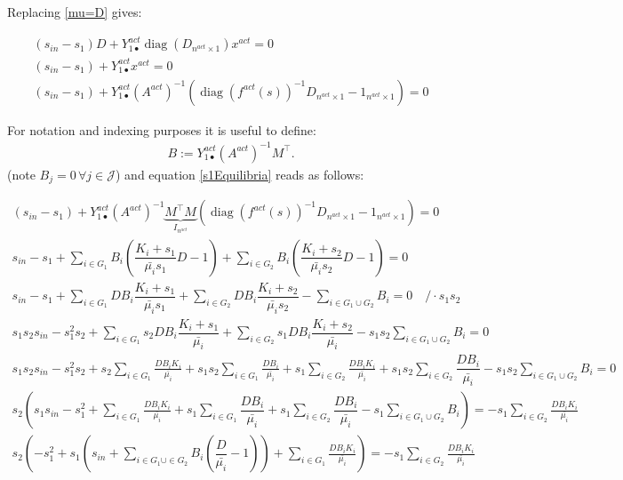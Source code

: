 \documentclass[processes,article,submit,moreauthors,pdftex]{Definitions/mdpi}
\DeclareMathOperator{\diag}{diag}
\begin{document}
Replacing \eqref{mu=D} gives: 

\begin{align} 
(s_{in}-s_1)D + Y^{act}_{1\bullet} \diag(D_{n^{act}\times 1})x^{act}  = 0  \\
(s_{in}-s_1) + Y^{act}_{1\bullet} x^{act}  = 0  \\
\label{s1Equilibria} (s_{in}-s_1) + Y^{act}_{1\bullet}(A^{act})^{-1}(\diag(f^{act}(s))^{-1}D_{n^{act}\times 1} - 1_{n^{act}\times 1}) = 0
\end{align} 

For notation and indexing purposes it is useful to define: 
\begin{align}
B := Y^{act}_{1\bullet} (A^{act})^{-1}M^\top.
\end{align}
(note $B_j = 0 \, \forall j \in \mathcal{J}$) and equation \eqref{s1Equilibria} reads as follows:

\begin{align}
(s_{in}-s_1) + Y^{act}_{1\bullet}(A^{act})^{-1}\underbrace{M^\top M}_{I_{n^{act}}}(\diag(f^{act}(s))^{-1} D_{n^{act}\times 1} - 1_{n^{act}\times 1}) = 0\\
\displaystyle s_{in} - s_1 + \sum \limits_{i \in G_1} B_i \left(\dfrac{K_i+s_1}{\bar{\mu_i}s_1}D - 1 \right) + \sum \limits_{i \in G_2 } B_i \left(\dfrac{K_i+s_2}{\bar{\mu_i}s_2}D - 1 \right)= 0 \label{to_be_reused}\\
\displaystyle s_{in} - s_1 + \sum \limits_{i \in G_1 } DB_i \dfrac{K_i+s_1}{\bar{\mu_i}s_1}+ \sum \limits_{i \in G_2 } DB_i \dfrac{K_i+s_2}{\bar{\mu_i}s_2} - \sum \limits_{i \in G_1 \cup G_2}B_i= 0 \quad /\cdot s_1s_2 
\\
\displaystyle s_1s_2 s_{in}- s^2_1s_2 + \sum \limits_{i \in G_1} s_2DB_i \dfrac{K_i+s_1}{\bar{\mu_i}}+ \sum \limits_{i \in G_2 } s_1DB_i \dfrac{K_i+s_2}{\bar{\mu_i}} - s_1s_2\sum \limits_{i \in G_1 \cup G_2}B_i= 0 \\
\displaystyle s_1s_2 s_{in}- s^2_1s_2 + s_2\sum \limits_{i \in G_1 } \frac{DB_iK_i}{\bar{\mu_i}}+s_1s_2\sum \limits_{i \in G_1 } \frac{DB_i}{\bar{\mu_i}}+ s_1\sum \limits_{i \in G_2 } \frac{DB_iK_i}{\bar{\mu_i}} + s_1s_2\sum \limits_{i \in G_2 } \dfrac{DB_i}{\bar{\mu_i}} - s_1s_2\sum \limits_{i \in G_1 \cup G_2}B_i= 0 \\
\displaystyle s_2\left(s_1s_{in} - s^2_1 + \sum \limits_{i \in G_1} \frac{DB_iK_i}{\bar{\mu_i}} +s_1\sum \limits_{i \in G_1 } \dfrac{DB_i}{\bar{\mu_i}}+s_1\sum \limits_{i \in G_2 } \dfrac{DB_i}{\bar{\mu_i}}  - s_1\sum \limits_{i \in G_1 \cup G_2}B_i  \right) = - s_1\sum \limits_{i \in G_2 } \frac{DB_iK_i}{\bar{\mu_i}} \\
\displaystyle s_2\left( - s^2_1 +s_1\left(s_{in}+\sum \limits_{i \in G_1 \cup \in G_2 } B_i\left(\dfrac{D}{\bar{\mu_i}}-1\right) \right) + \sum \limits_{i \in G_1} \frac{DB_iK_i}{\bar{\mu_i}}\right) = - s_1\sum \limits_{i \in G_2 } \frac{DB_iK_i}{\bar{\mu_i}}
\end{align}
\end{document}
